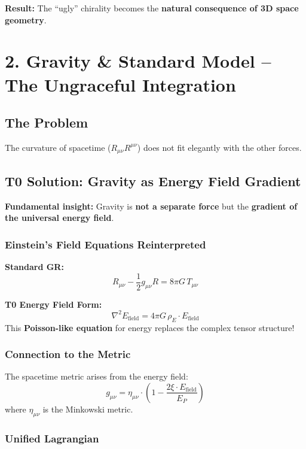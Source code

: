 	\textbf{Result:} The ``ugly'' chirality becomes the \textbf{natural consequence of 3D space geometry}.
	
	
	
	\section*{2. Gravity \& Standard Model – The Ungraceful Integration}
	
	\subsection*{The Problem}
	The curvature of spacetime ($R_{\mu\nu} R^{\mu\nu}$) does not fit elegantly with the other forces.
	
	\subsection*{T0 Solution: Gravity as Energy Field Gradient}
	
	\textbf{Fundamental insight:} Gravity is \textbf{not a separate force} but the \textbf{gradient of the universal energy field}.
	
	\subsubsection*{Einstein's Field Equations Reinterpreted}
	
	\textbf{Standard GR:}
	\[
	R_{\mu\nu} - \frac{1}{2}g_{\mu\nu}R = 8\pi G \, T_{\mu\nu}
	\]
	
	\textbf{T0 Energy Field Form:}
	\[
	\boxed{\nabla^2 E_{\text{field}} = 4\pi G \, \rho_E \cdot E_{\text{field}}}
	\]
	This \textbf{Poisson-like equation} for energy replaces the complex tensor structure!
	
	\subsubsection*{Connection to the Metric}
	
	The spacetime metric arises from the energy field:
	\[
	g_{\mu\nu} = \eta_{\mu\nu} \cdot \left(1 - \frac{2\xi \cdot E_{\text{field}}}{E_P}\right)
	\]
	where $\eta_{\mu\nu}$ is the Minkowski metric.
	
	\subsubsection*{Unified Lagrangian}
	

